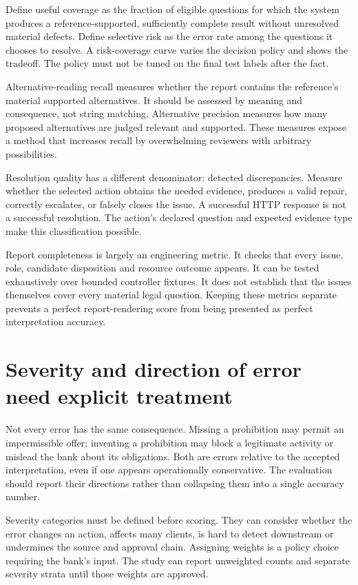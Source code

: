 \documentclass[12pt,a4paper,oneside,openany]{book}
\begin{document}
Define useful coverage as the fraction of eligible questions for which the system
produces a reference-supported, sufficiently complete result without unresolved
material defects. Define selective risk as the error rate among the questions it
chooses to resolve. A risk-coverage curve varies the decision policy and shows the
tradeoff. The policy must not be tuned on the final test labels after the fact.

Alternative-reading recall measures whether the report contains the reference's
material supported alternatives. It should be assessed by meaning and consequence,
not string matching. Alternative precision measures how many proposed alternatives
are judged relevant and supported. These measures expose a method that increases
recall by overwhelming reviewers with arbitrary possibilities.

Resolution quality has a different denominator: detected discrepancies. Measure
whether the selected action obtains the needed evidence, produces a valid repair,
correctly escalates, or falsely closes the issue. A successful HTTP response is
not a successful resolution. The action's declared question and expected evidence
type make this classification possible.

Report completeness is largely an engineering metric. It checks that every issue,
role, candidate disposition and resource outcome appears. It can be tested
exhaustively over bounded controller fixtures. It does not establish that the
issues themselves cover every material legal question. Keeping these metrics
separate prevents a perfect report-rendering score from being presented as
perfect interpretation accuracy.

\section{Severity and direction of error need explicit treatment}

Not every error has the same consequence. Missing a prohibition may permit an
impermissible offer; inventing a prohibition may block a legitimate activity or
mislead the bank about its obligations. Both are errors relative to the accepted
interpretation, even if one appears operationally conservative. The evaluation
should report their directions rather than collapsing them into a single accuracy
number.

Severity categories must be defined before scoring. They can consider whether the
error changes an action, affects many clients, is hard to detect downstream or
undermines the source and approval chain. Assigning weights is a policy choice
requiring the bank's input. The study can report unweighted counts and separate
severity strata until those weights are approved.
\end{document}
